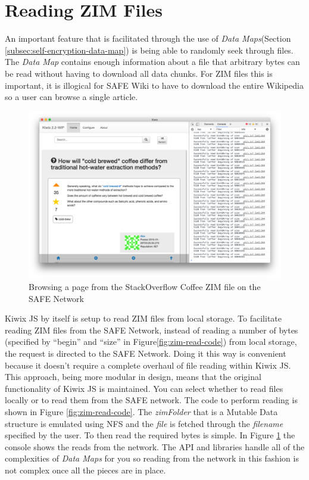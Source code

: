 \section{Reading ZIM Files}
 
An important feature that is facilitated through the use of \textit{Data Maps}(Section \ref{subsec:self-encryption-data-map}) is being able to randomly seek through files. The \textit{Data Map} contains enough information about a file that arbitrary bytes can be read without having to download all data chunks. For ZIM files this is important, it is illogical for SAFE Wiki to have to download the entire Wikipedia so a user can browse a single article.

\begin{figure}[h]
	\begin{center}
		\includegraphics[scale=0.6]{images/safe-wiki-browsing-coffee}
		\caption{Browsing a page from the StackOverflow Coffee ZIM file on the SAFE Network}
		\label{fig:browsing-coffee}
	\end{center}
\end{figure}

Kiwix JS by itself is setup to read ZIM files from local storage. To facilitate reading ZIM files from the SAFE Network, instead of reading a number of bytes (specified by ``begin'' and ``size'' in Figure\ref{fig:zim-read-code}) from local storage, the request is directed to the SAFE Network. Doing it this way is convenient because it doesn't require a complete overhaul of file reading within Kiwix JS. This approach, being more modular in design, means that the original functionality of Kiwix JS is maintained. You can select whether to read files locally or to read them from the SAFE network. The code to perform reading is shown in Figure \ref{fig:zim-read-code}. The \textit{zimFolder} that is a Mutable Data structure is emulated using NFS and the \textit{file} is fetched through the \textit{filename} specified by the user. To then read the required bytes is simple. In Figure \ref{fig:browsing-coffee} the console shows the reads from the network. The API and libraries handle all of the complexities of \textit{Data Maps} for you so reading from the network in this fashion is not complex once all the pieces are in place.

